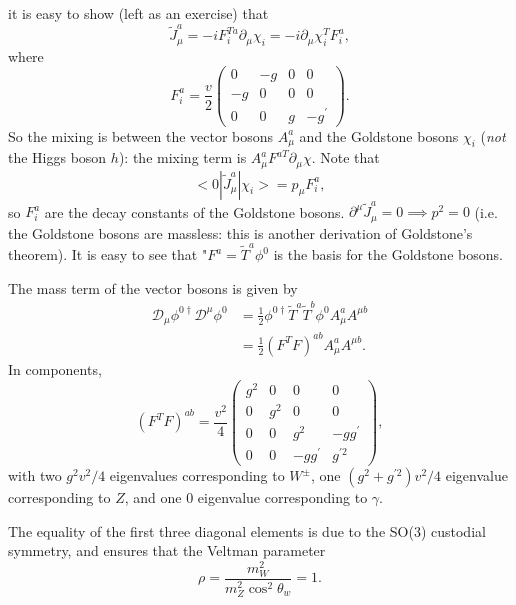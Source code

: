 \documentclass[a4paper,12pt]{article}
\begin{document}
it is easy to show (left as an exercise) that
\begin{equation}
\tilde{J}_\mu^a = -i F^{T a}_i \partial_\mu \chi_i = -i \partial_\mu \chi_i^T F_i^a,
\end{equation}
where
\[F_i^a = \frac{v}{2} \left( \begin{array}{cccc}
0 & -g & 0 & 0 \\
-g & 0 & 0 & 0 \\
0 & 0 & g & -g^\prime 
\end{array} \right). \]
So the mixing is between the vector bosons $A_\mu^a$ and the Goldstone bosons $\chi_i$ (\textit{not} the Higgs boson $h$): the mixing term is $A_\mu^a F^{a T} \partial_\mu \chi$. Note that
\begin{equation}
<0|\tilde{J}_\mu^a|\chi_i> = p_\mu F^a_i,
\end{equation}
so $F_i^a$ are the decay constants of the Goldstone bosons. $\partial^\mu \tilde{J}_\mu^a = 0 \implies p^2=0$ (i.e. the Goldstone bosons are massless: this is another derivation of Goldstone's theorem). It is easy to see that "$F^a = \tilde{T}^a \phi^0$ is the basis for the Goldstone bosons.

The mass term of the vector bosons is given by
\begin{equation}
\begin{split}
\mathcal{D}_\mu \phi^{0 \dagger} \mathcal{D}^\mu \phi^0 &= \frac{1}{2} \phi^{0 \dagger} \tilde{T}^a \tilde{T}^b \phi^0 A_\mu^a A^{\mu b} \\
&= \frac{1}{2}(F^TF)^{ab} A_\mu^a A^{\mu b}.
\end{split}
\end{equation}
In components,
\[(F^TF)^{ab} = \frac{v^2}{4} \left( \begin{array}{cccc}
g^2 & 0 & 0 & 0 \\
0 & g^2 & 0 & 0 \\
0 & 0 & g^2 & -gg^\prime \\
0 & 0 & - gg^\prime & g^{\prime 2} 
\end{array} \right), \]
with two $g^2v^2/4$ eigenvalues corresponding to $W^\pm$, one $(g^2 + g^{\prime 2})v^2/4$ eigenvalue corresponding to $Z$, and one $0$ eigenvalue corresponding to $\gamma$.

The equality of the first three diagonal elements is due to the SO(3) custodial symmetry, and ensures that the Veltman parameter
\begin{equation}
\rho = \frac{m_W^2}{m_Z^2 \cos^2\theta_w} = 1.
\end{equation}
%
\end{document}
